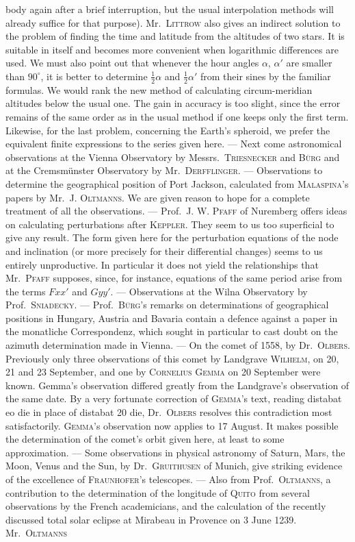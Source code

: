 body again after a brief interruption, but the usual interpolation methods will already suffice for that purpose). Mr.\ \textsc{Littrow} also gives an indirect solution to the problem of finding the time and latitude from the altitudes of two stars. It is suitable in itself and becomes more convenient when logarithmic differences are used. We must also point out that whenever the hour angles $\alpha$, $\alpha'$ are smaller than $90^{\circ}$, it is better to determine $\frac{1}{2}\alpha$ and $\frac{1}{2}\alpha'$ from their sines by the familiar formulas. We would rank the new method of calculating circum-meridian altitudes below the usual one. The gain in accuracy is too slight, since the error remains of the same order as in the usual method if one keeps only the first term. Likewise, for the last problem, concerning the Earth's spheroid, we prefer the equivalent finite expressions to the series given here. --- Next come astronomical observations at the Vienna Observatory by Messrs.\ \textsc{Triesnecker} and \textsc{Bürg} and at the Cremsmünster Observatory by Mr.\ \textsc{Derfflinger}. --- Observations to determine the geographical position of Port Jackson, calculated from \textsc{Malaspina}’s papers by Mr.\ J. \textsc{Oltmanns}. We are given reason to hope for a complete treatment of all the observations. --- Prof.\ J. W. \textsc{Pfaff} of Nuremberg offers ideas on calculating perturbations after \textsc{Keppler}. They seem to us too superficial to give any result. The form given here for the perturbation equations of the node and inclination (or more precisely for their differential changes) seems to us entirely unproductive. In particular it does not yield the relationships that Mr.\ \textsc{Pfaff} supposes, since, for instance, equations of the same period arise from the terms $Fxx'$ and $Gyy'$. --- Observations at the Wilna Observatory by Prof.\ \textsc{Sniadecky}. --- Prof.\ \textsc{Bürg}’s remarks on determinations of geographical positions in Hungary, Austria and Bavaria contain a defence against a paper in the monatliche Correspondenz, which sought in particular to cast doubt on the azimuth determination made in Vienna. --- On the comet of 1558, by Dr.\ \textsc{Olbers}. Previously only three observations of this comet by Landgrave \textsc{Wilhelm}, on 20, 21 and 23 September, and one by \textsc{Cornelius Gemma} on 20 September were known. Gemma's observation differed greatly from the Landgrave’s observation of the same date. By a very fortunate correction of \textsc{Gemma}’s text, reading distabat eo die in place of distabat 20 die, Dr.\ \textsc{Olbers} resolves this contradiction most satisfactorily. \textsc{Gemma}’s observation now applies to 17 August. It makes possible the determination of the comet’s orbit given here, at least to some approximation. --- Some observations in physical astronomy of Saturn, Mars, the Moon, Venus and the Sun, by Dr.\ \textsc{Gruithusen} of Munich, give striking evidence of the excellence of \textsc{Fraunhofer}’s telescopes. --- Also from Prof.\ \textsc{Oltmanns}, a contribution to the determination of the longitude of \textsc{Quito} from several observations by the French academicians, and the calculation of the recently discussed total solar eclipse at Mirabeau in Provence on 3 June 1239. Mr.\ \textsc{Oltmanns} 